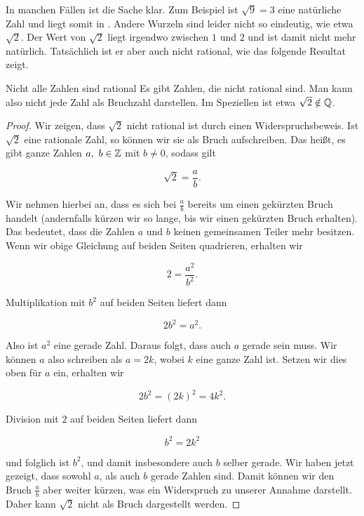 \documentclass[../../main.tex]{subfiles}
\begin{document}
	In manchen Fällen ist die Sache klar. Zum Beispiel ist $\sqrt{9}=3$ eine natürliche Zahl und liegt somit in \Rational. Andere Wurzeln sind leider nicht so eindeutig, wie etwa $\sqrt{2}$. Der Wert von $\sqrt{2}$ liegt irgendwo zwischen $1$ und $2$ und ist damit nicht mehr natürlich. Tatsächlich ist er aber auch nicht rational, wie das folgende Resultat zeigt.
	
	\begin{theorem}{Nicht alle Zahlen sind rational}
		Es gibt Zahlen, die nicht rational sind. Man kann also nicht jede Zahl als Bruchzahl darstellen. Im Speziellen ist etwa $\sqrt{2} \notin\mathbb{Q}$.
	\end{theorem}
	
	\begin{proof}
		Wir zeigen, dass $\sqrt{2}$ nicht rational ist durch einen Widerspruchsbeweis. Ist $\sqrt{2}$ eine rationale Zahl, so können wir sie als Bruch aufschreiben. Das heißt, es gibt ganze Zahlen $a, \ b\in\Integer$ mit $b \neq 0$, sodass gilt
		
		$$\sqrt{2} = \frac{a}{b}.$$
		
		Wir nehmen hierbei an, dass es sich bei $\frac{a}{b}$ bereits um einen gekürzten Bruch handelt (andernfalls kürzen wir so lange, bis wir einen gekürzten Bruch erhalten). Das bedeutet, dass die Zahlen $a$ und $b$ keinen gemeinsamen Teiler mehr besitzen. Wenn wir obige Gleichung auf beiden Seiten quadrieren, erhalten wir
		
		$$2 = \frac{a^2}{b^2}.$$
		
		Multiplikation mit $b^2$ auf beiden Seiten liefert dann
		
		$$2b^2 = a^2.$$ 
		
		Also ist $a^2$ eine gerade Zahl. Daraus folgt, dass auch $a$ gerade sein muss. Wir können $a$ also schreiben als 
		$a = 2k$, wobei $k$ eine ganze Zahl ist. Setzen wir dies oben für $a$ ein, erhalten wir
		
		$$2b^2 = \left(2k\right)^2 = 4k^2.$$
		
		Division mit $2$ auf beiden Seiten liefert dann
		
		$$b^2 = 2k^2$$
		
		und folglich ist $b^2$, und damit insbesondere auch $b$ selber gerade. Wir haben jetzt gezeigt, dass sowohl $a$, als auch $b$ gerade Zahlen sind. Damit können wir den Bruch $\frac{a}{b}$ aber weiter kürzen, was ein Widerspruch zu unserer Annahme darstellt. Daher kann $\sqrt{2}$ nicht als Bruch dargestellt werden.
	\end{proof}
\end{document}
